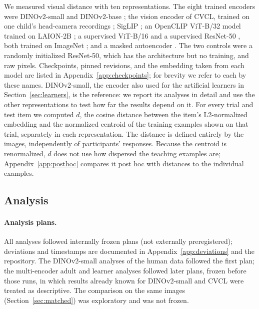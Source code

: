 \documentclass[11pt]{article}
\begin{document}
We measured visual distance with ten representations. The eight trained encoders were DINOv2-small and DINOv2-base \parencite{oquab2023}; the vision encoder of CVCL, trained on one child's head-camera recordings \parencite{vong2024}; SigLIP \parencite{zhai2023}; an OpenCLIP ViT-B/32 model trained on LAION-2B \parencite{cherti2023,schuhmann2022}; a supervised ViT-B/16 \parencite{dosovitskiy2020} and a supervised ResNet-50 \parencite{he2016}, both trained on ImageNet \parencite{deng2009}; and a masked autoencoder \parencite[MAE;][]{he2022}. The two controls were a randomly initialized ResNet-50, which has the architecture but no training, and raw pixels. Checkpoints, pinned revisions, and the embedding taken from each model are listed in Appendix~\ref{app:checkpoints}; for brevity we refer to each by these names. DINOv2-small, the encoder also used for the artificial learners in Section~\ref{sec:learners}, is the reference: we report its analyses in detail and use the other representations to test how far the results depend on it. For every trial and test item we computed $d$, the cosine distance between the item's L2-normalized embedding and the normalized centroid of the training examples shown on that trial, separately in each representation. The distance is defined entirely by the images, independently of participants' responses. Because the centroid is renormalized, $d$ does not use how dispersed the teaching examples are; Appendix~\ref{app:posthoc} compares it post hoc with distances to the individual examples.

\subsection{Analysis}

\paragraph{Analysis plans.} All analyses followed internally frozen plans (not externally preregistered); deviations and timestamps are documented in Appendix~\ref{app:deviations} and the repository. The DINOv2-small analyses of the human data followed the first plan; the multi-encoder adult and learner analyses followed later plans, frozen before those runs, in which results already known for DINOv2-small and CVCL were treated as descriptive. The comparison on the same images (Section~\ref{sec:matched}) was exploratory and was not frozen.
\end{document}
